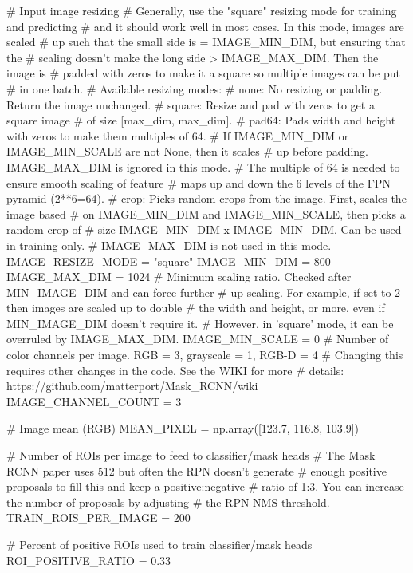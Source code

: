     # Input image resizing
    # Generally, use the "square" resizing mode for training and predicting
    # and it should work well in most cases. In this mode, images are scaled
    # up such that the small side is = IMAGE_MIN_DIM, but ensuring that the
    # scaling doesn't make the long side > IMAGE_MAX_DIM. Then the image is
    # padded with zeros to make it a square so multiple images can be put
    # in one batch.
    # Available resizing modes:
    # none:   No resizing or padding. Return the image unchanged.
    # square: Resize and pad with zeros to get a square image
    #         of size [max_dim, max_dim].
    # pad64:  Pads width and height with zeros to make them multiples of 64.
    #         If IMAGE_MIN_DIM or IMAGE_MIN_SCALE are not None, then it scales
    #         up before padding. IMAGE_MAX_DIM is ignored in this mode.
    #         The multiple of 64 is needed to ensure smooth scaling of feature
    #         maps up and down the 6 levels of the FPN pyramid (2**6=64).
    # crop:   Picks random crops from the image. First, scales the image based
    #         on IMAGE_MIN_DIM and IMAGE_MIN_SCALE, then picks a random crop of
    #         size IMAGE_MIN_DIM x IMAGE_MIN_DIM. Can be used in training only.
    #         IMAGE_MAX_DIM is not used in this mode.
    IMAGE_RESIZE_MODE = "square"
    IMAGE_MIN_DIM = 800
    IMAGE_MAX_DIM = 1024
    # Minimum scaling ratio. Checked after MIN_IMAGE_DIM and can force further
    # up scaling. For example, if set to 2 then images are scaled up to double
    # the width and height, or more, even if MIN_IMAGE_DIM doesn't require it.
    # However, in 'square' mode, it can be overruled by IMAGE_MAX_DIM.
    IMAGE_MIN_SCALE = 0
    # Number of color channels per image. RGB = 3, grayscale = 1, RGB-D = 4
    # Changing this requires other changes in the code. See the WIKI for more
    # details: https://github.com/matterport/Mask_RCNN/wiki
    IMAGE_CHANNEL_COUNT = 3

    # Image mean (RGB)
    MEAN_PIXEL = np.array([123.7, 116.8, 103.9])

    # Number of ROIs per image to feed to classifier/mask heads
    # The Mask RCNN paper uses 512 but often the RPN doesn't generate
    # enough positive proposals to fill this and keep a positive:negative
    # ratio of 1:3. You can increase the number of proposals by adjusting
    # the RPN NMS threshold.
    TRAIN_ROIS_PER_IMAGE = 200

    # Percent of positive ROIs used to train classifier/mask heads
    ROI_POSITIVE_RATIO = 0.33

